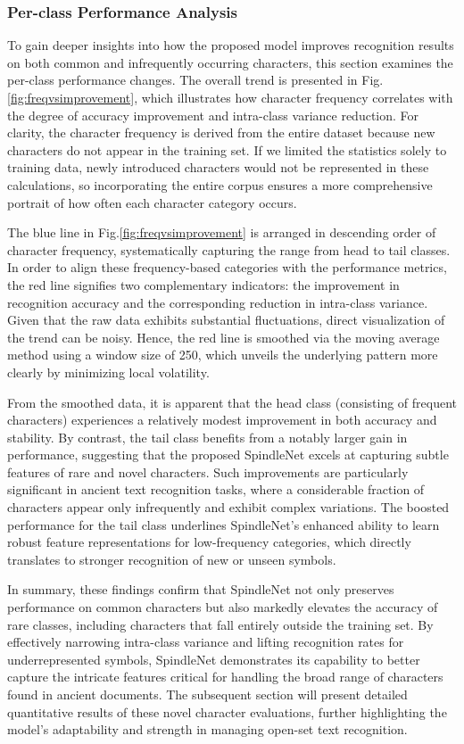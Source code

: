 \subsubsection{Per-class Performance Analysis}  \noindent To gain deeper insights into how the proposed model improves recognition results on both common and infrequently occurring characters, this section examines the per-class performance changes. The overall trend is presented in Fig.\ref{fig:freqvsimprovement}, which illustrates how character frequency correlates with the degree of accuracy improvement and intra-class variance reduction. For clarity, the character frequency is derived from the entire dataset because new characters do not appear in the training set. If we limited the statistics solely to training data, newly introduced characters would not be represented in these calculations, so incorporating the entire corpus ensures a more comprehensive portrait of how often each character category occurs.

The blue line in Fig.\ref{fig:freqvsimprovement} is arranged in descending order of character frequency, systematically capturing the range from head to tail classes. In order to align these frequency-based categories with the performance metrics, the red line signifies two complementary indicators: the improvement in recognition accuracy and the corresponding reduction in intra-class variance. Given that the raw data exhibits substantial fluctuations, direct visualization of the trend can be noisy. Hence, the red line is smoothed via the moving average method using a window size of 250, which unveils the underlying pattern more clearly by minimizing local volatility.

From the smoothed data, it is apparent that the head class (consisting of frequent characters) experiences a relatively modest improvement in both accuracy and stability. By contrast, the tail class benefits from a notably larger gain in performance, suggesting that the proposed SpindleNet excels at capturing subtle features of rare and novel characters. Such improvements are particularly significant in ancient text recognition tasks, where a considerable fraction of characters appear only infrequently and exhibit complex variations. The boosted performance for the tail class underlines SpindleNet’s enhanced ability to learn robust feature representations for low-frequency categories, which directly translates to stronger recognition of new or unseen symbols.

In summary, these findings confirm that SpindleNet not only preserves performance on common characters but also markedly elevates the accuracy of rare classes, including characters that fall entirely outside the training set. By effectively narrowing intra-class variance and lifting recognition rates for underrepresented symbols, SpindleNet demonstrates its capability to better capture the intricate features critical for handling the broad range of characters found in ancient documents. The subsequent section will present detailed quantitative results of these novel character evaluations, further highlighting the model’s adaptability and strength in managing open-set text recognition.



